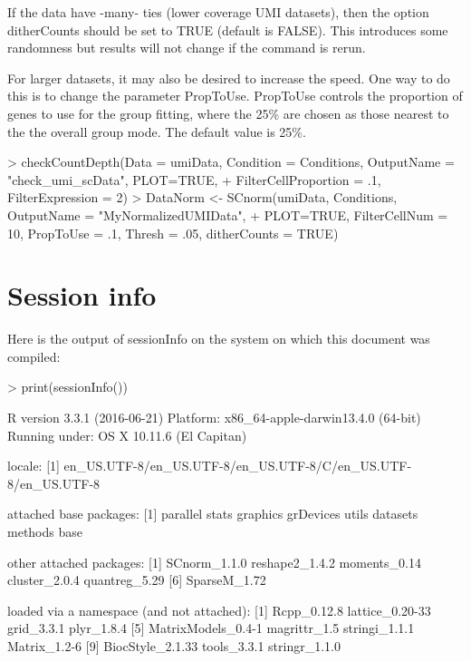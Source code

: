 \documentclass{article}
\begin{document}
If the data have -many- ties (lower coverage UMI datasets), then the option ditherCounts should be set to TRUE (default is FALSE). This introduces some randomness but results will not change if the command is rerun.

For larger datasets, it may also be desired to increase the speed. One way to do this is to change the parameter PropToUse. PropToUse controls the proportion of genes to use for the group fitting, where the 25\% are chosen as those nearest to the the overall group mode. The default value is 25\%. 

\begin{Schunk}
\begin{Sinput}
> checkCountDepth(Data = umiData, Condition = Conditions, OutputName = "check_umi_scData", PLOT=TRUE,
+ FilterCellProportion = .1, FilterExpression = 2)
> DataNorm <- SCnorm(umiData, Conditions, OutputName = "MyNormalizedUMIData",
+ PLOT=TRUE, FilterCellNum = 10, PropToUse = .1, Thresh = .05, ditherCounts = TRUE)
\end{Sinput}
\end{Schunk}


\section{Session info}
Here is the output of sessionInfo on the system on which this document was compiled:
\begin{Schunk}
\begin{Sinput}
>   print(sessionInfo())
\end{Sinput}
\begin{Soutput}
R version 3.3.1 (2016-06-21)
Platform: x86_64-apple-darwin13.4.0 (64-bit)
Running under: OS X 10.11.6 (El Capitan)

locale:
[1] en_US.UTF-8/en_US.UTF-8/en_US.UTF-8/C/en_US.UTF-8/en_US.UTF-8

attached base packages:
[1] parallel  stats     graphics  grDevices utils     datasets  methods   base     

other attached packages:
[1] SCnorm_1.1.0   reshape2_1.4.2 moments_0.14   cluster_2.0.4  quantreg_5.29 
[6] SparseM_1.72  

loaded via a namespace (and not attached):
 [1] Rcpp_0.12.8        lattice_0.20-33    grid_3.3.1         plyr_1.8.4        
 [5] MatrixModels_0.4-1 magrittr_1.5       stringi_1.1.1      Matrix_1.2-6      
 [9] BiocStyle_2.1.33   tools_3.3.1        stringr_1.1.0     
\end{Soutput}
\end{Schunk}
  
  \vspace{1cm}
%


%
\end{document}
